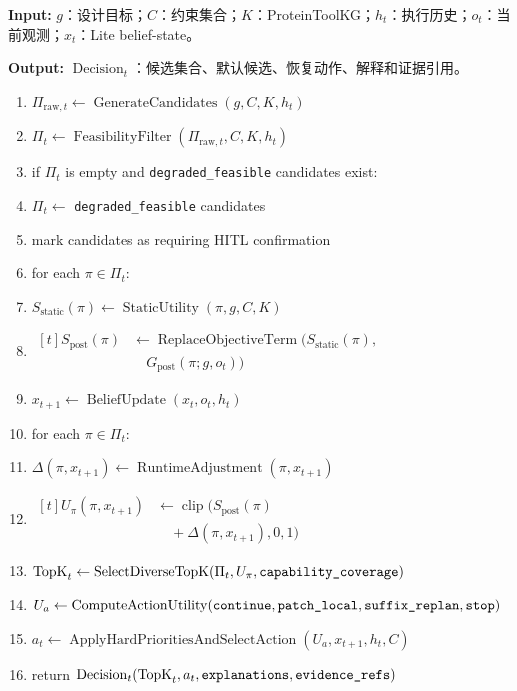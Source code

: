 \begin{Shaded}
\small
\noindent\textbf{Input:} $g$：设计目标；$C$：约束集合；$K$：ProteinToolKG；$h_t$：执行历史；$o_t$：当前观测；$x_t$：Lite belief-state。

\noindent\textbf{Output:} $\operatorname{Decision}_t$：候选集合、默认候选、恢复动作、解释和证据引用。

\begin{enumerate}[label=\arabic*.,leftmargin=2.6em,itemsep=0.18em]
\item $\Pi_{\mathrm{raw},t} \leftarrow \operatorname{GenerateCandidates}(g,C,K,h_t)$
\item $\Pi_t \leftarrow \operatorname{FeasibilityFilter}(\Pi_{\mathrm{raw},t},C,K,h_t)$
\item if $\Pi_t$ is empty and \texttt{degraded\_feasible} candidates exist:
\item \quad $\Pi_t \leftarrow$ \texttt{degraded\_feasible} candidates
\item \quad mark candidates as requiring HITL confirmation
\item for each $\pi \in \Pi_t$:
\item \quad $S_{\mathrm{static}}(\pi) \leftarrow \operatorname{StaticUtility}(\pi,g,C,K)$
\item \quad $\begin{aligned}[t]
S_{\mathrm{post}}(\pi) &\leftarrow \operatorname{ReplaceObjectiveTerm}(S_{\mathrm{static}}(\pi),\\
&\quad G_{\mathrm{post}}(\pi;g,o_t))
\end{aligned}$
\item $x_{t+1} \leftarrow \operatorname{BeliefUpdate}(x_t,o_t,h_t)$
\item for each $\pi \in \Pi_t$:
\item \quad $\Delta(\pi,x_{t+1}) \leftarrow \operatorname{RuntimeAdjustment}(\pi,x_{t+1})$
\item \quad $\begin{aligned}[t]
U_{\pi}(\pi,x_{t+1}) &\leftarrow \operatorname{clip}(S_{\mathrm{post}}(\pi)\\
&\quad{}+\Delta(\pi,x_{t+1}),0,1)
\end{aligned}$
\item $\operatorname{TopK}_t \leftarrow \operatorname{SelectDiverseTopK}(\Pi_t,U_{\pi},\text{\texttt{capability\_coverage}})$
\item $U_a \leftarrow \operatorname{ComputeActionUtility}(\text{\texttt{continue}},\text{\texttt{patch\_local}},\text{\texttt{suffix\_replan}},\text{\texttt{stop}})$
\item $a_t \leftarrow \operatorname{ApplyHardPrioritiesAndSelectAction}(U_a,x_{t+1},h_t,C)$
\item return $\operatorname{Decision}_t(\operatorname{TopK}_t,a_t,\text{\texttt{explanations}},\text{\texttt{evidence\_refs}})$
\end{enumerate}
\end{Shaded}

